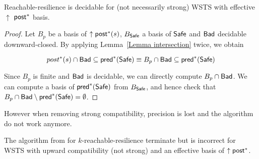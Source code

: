 \begin{theorem}
{\sc Reachable-resilience} is decidable for (not necessarily strong) WSTS with effective 
$\uparrow$ $\textsf{post}^*$ basis.
\end{theorem}


\begin{proof}
Let $B_p$ be a basis of $\uparrow \textsf{post}^*(s)$, $B_{\textsf{Safe}}$ a basis of $\textsf{Safe}$
and $\textsf{Bad}$ decidable downward-closed.
By applying Lemma~\ref{Lemma intersection} twice, we obtain

$$ post^*(s) \cap \textsf{Bad} \subseteq \textsf{pred}^*(\textsf{Safe}) \equiv B_p \cap \textsf{Bad} \subseteq \textsf{pred}^*(\textsf{Safe})$$


Since $B_p$ is finite and $\textsf{Bad}$ is decidable, we can directly compute $ B_p \cap \textsf{Bad}$.
We can compute a basis of $\textsf{pred}^*(\textsf{Safe})$ from $B_{\textsf{Safe}}$, and hence check that $B_p \cap \textsf{Bad} \setminus \textsf{pred}^*(\textsf{Safe}) = \emptyset$. 
\end{proof}

%
%

However when removing strong compatibility, precision is lost and the algorithm do not work anymore.

\begin{proposition}
The algorithm from \cite{DBLP:conf/gg/Ozkan22} for {\sc $k$-reachable-resilience} terminate but is incorrect for WSTS with upward compatibility (not strong) and an effective basis of $\uparrow \textsf{post}^*$.
\end{proposition}

